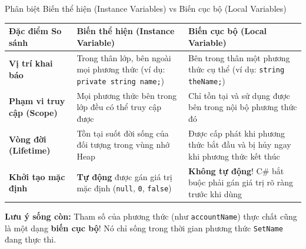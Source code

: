 \documentclass[aspectratio=169, 10pt]{beamer}
\begin{document}
\begin{frame}{Phân biệt Biến thể hiện (Instance Variables) vs Biến cục bộ (Local Variables)}
  \begin{table}
    \centering\small
    \begin{tabularx}{\textwidth}{lXX}
      \toprule
      \textbf{Đặc điểm So sánh} & \textbf{Biến thể hiện (Instance Variable)} & \textbf{Biến cục bộ (Local Variable)} \\
      \midrule
      \textbf{Vị trí khai báo} & Trong thân lớp, bên ngoài mọi phương thức (ví dụ: \texttt{private string name;}) & Bên trong thân một phương thức cụ thể (ví dụ: \texttt{string theName;}) \\
      \textbf{Phạm vi truy cập (Scope)} & Mọi phương thức bên trong lớp đều có thể truy cập được & Chỉ tồn tại và sử dụng được bên trong nội bộ phương thức đó \\
      \textbf{Vòng đời (Lifetime)} & Tồn tại suốt đời sống của đối tượng trong vùng nhớ Heap & Được cấp phát khi phương thức bắt đầu và bị hủy ngay khi phương thức kết thúc \\
      \textbf{Khởi tạo mặc định} & \textbf{Tự động} được gán giá trị mặc định (\texttt{null}, \texttt{0}, \texttt{false}) & \textbf{Không tự động}! C\# bắt buộc phải gán giá trị rõ ràng trước khi dùng \\
      \bottomrule
    \end{tabularx}
  \end{table}
  \vspace{2mm}
  \begin{alertblock}{\textbf{Lưu ý sống còn:}}
    Tham số của phương thức (như \texttt{accountName}) thực chất cũng là một dạng \textbf{biến cục bộ}! Nó chỉ sống trong thời gian phương thức \texttt{SetName} đang thực thi.
  \end{alertblock}
\end{frame}
\end{document}
